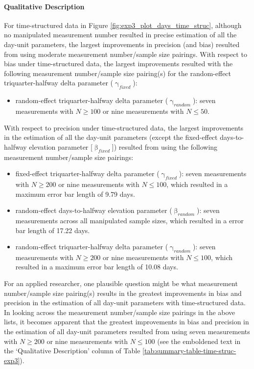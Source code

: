\documentclass[
12pt, %
twoside,
english]{guelphthesis}
\begin{document}
\hypertarget{qualitative-time-struc-exp3}{%
\paragraph{Qualitative Description}\label{qualitative-time-struc-exp3}}

For time-structured data in Figure \ref{fig:exp3_plot_days_time_struc}, although no manipulated measurement number resulted in precise estimation of all the day-unit parameters, the largest improvements in precision (and bias) resulted from using moderate measurement number/sample size pairings. With respect to bias under time-structured data, the largest improvements resulted with the following measurement number/sample size pairing(s) for the random-effect triquarter-halfway delta parameter (\(\upgamma_{fixed}\)):
\begin{itemize}
\tightlist
\item
  random-effect triquarter-halfway delta parameter (\(\upgamma_{random}\)): seven measurements with \(N \ge 100\) or nine measurements with \(N \le 50\).
\end{itemize}
\noindent With respect to precision under time-structured data, the largest improvements in the estimation of all the day-unit parameters (except the fixed-effect days-to-halfway elevation parameter {[}\(\upbeta_{fixed}\){]}) resulted from using the following measurement number/sample size pairings:
\begin{itemize}
\tightlist
\item
  fixed-effect triquarter-halfway delta parameter (\(\upgamma_{fixed}\)): seven measurements with \(N \ge 200\) or nine measurements with \(N \le 100\), which resulted in a maximum error bar length of 9.79 days.
\item
  random-effect days-to-halfway elevation parameter (\(\upbeta_{random}\)): seven measurements across all manipulated sample sizes, which resulted in a error bar length of 17.22 days.
\item
  random-effect triquarter-halfway delta parameter (\(\upgamma_{random}\)): seven measurements with \(N \ge 200\) or nine measurements with \(N \le 100\), which resulted in a maximum error bar length of 10.08 days.
\end{itemize}
For an applied researcher, one plausible question might be what measurement number/sample size pairing(s) results in the greatest improvements in bias and precision in the estimation of all day-unit parameters with time-structured data. In looking across the measurement number/sample size pairings in the above lists, it becomes apparent that the greatest improvements in bias and precision in the estimation of all day-unit parameters resulted from using seven measurements with \(N \ge 200\) or nine measurements with \(N \le 100\) (see the emboldened text in the `Qualitative Description' column of Table \ref{tab:summary-table-time-struc-exp3}).
\end{document}
